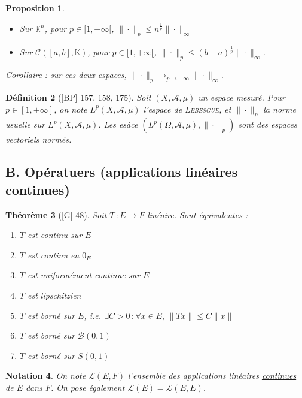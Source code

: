 \documentclass[10pt, a4paper, parskip=full, twoside, twocolumn]{report}
\newtheorem{definition}{Définition}
\newtheorem{theorem}[definition]{Théorème}
\newtheorem{proposition}[definition]{Proposition}
\newtheorem{notation}[definition]{Notation}
\newcommand{\IK}{\mathbb{K}}
\newcommand{\B}{\mathcal{B}}
\newcommand{\A}{\mathscr{A}}
\begin{document}
\begin{proposition}
	\begin{itemize}
		\item Sur $\IK^n$, pour $p\in[1,+\infty[$, $\|\cdot\|_p\leq n^{\frac{1}{p}}\|\cdot\|_{\infty}$
		\item Sur $\mathcal{C}([a,b],\IK)$, pour $p\in[1,+\infty[$, $\|\cdot\|_p\leq (b-a)^{\frac{1}{p}}\|\cdot\|_{\infty}$.
	\end{itemize}

	Corollaire : sur ces deux espaces, $\|\cdot\|_p \to_{p\to +\infty}\|\cdot\|_{\infty}$.
\end{proposition}

\begin{definition}[\textnormal{[BP] 157, 158, 175}]
	Soit $(X,\A,\mu)$ un espace mesuré. Pour $p\in [1,+\infty]$, on note $L^p(X,\A, \mu)$ l'\emph{espace de \textsc{Lebesgue}}, et $\|\cdot\|_p$ la norme usuelle sur $L^p(X,\A,\mu)$.
	Les esâce $\left(L^p(\Omega,\A,\mu), \|\cdot\|_p\right)$ sont des espaces vectoriels normés.
\end{definition}

\subsection*{B. Opératuers (applications linéaires continues)}

\begin{theorem}[\textnormal{[G] 48}]
	Soit $T\,\colon E\to F$ linéaire. Sont équivalentes :
	\begin{enumerate}
		\item $T$ est continu sur $E$
		\item $T$ est continu en $0_E$
		\item $T$ est uniformément continue sur $E$
		\item $T$ est lipschitzien 
		\item $T$ est borné sur $E$, \emph{i.e.} $\exists C>0\,\colon \forall x\in E,\,\|Tx\| \leq C\|x\|$
		\item $T$ est borné sur $\overline{\B(0,1)}$
		\item $T$ est borné sur $S(0,1)$
	\end{enumerate}
\end{theorem}

\begin{notation}
	On note $\mathcal{L}(E,F)$ l'ensemble des applications linéaires \underline{continues} de $E$ dans $F$.
	On pose également $\mathcal{L}(E)=\mathcal{L}(E,E)$.
\end{notation}
\end{document}
